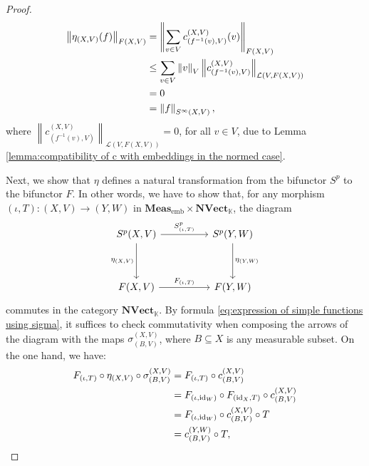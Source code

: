 \documentclass{amsart}
\theoremstyle{definition}
\theoremstyle{plain}
\newcommand{\norm}[1]{\left\lVert #1\right\rVert} %
\newcommand{\id}{\operatorname{id}}
\newcommand{\embMeas}{\mathbf{Meas}_\mathrm{emb}}
\newcommand{\NVect}{\mathbf{NVect}_{\mathbb{K}}}
\begin{document}
\begin{proof}
\begin{align}
                \norm{\eta_{(X,V)}(f)}_{F(X,V)} &= \norm{\sum_{v \in V} c_{\left( f^{-1}(v),V \right)}^{(X,V)}(v)}_{F(X,V)} \notag \\
                &\leq \sum_{v \in V} \norm{v}_V \norm{c_{\left( f^{-1}(v),V \right)}^{(X,V)}}_{\mathcal{L}(V,F(X,V))} \notag \\
                &= 0 \notag \\
                &= \norm{f}_{S^\infty(X,V)}, \notag
            \end{align} 
            where $\norm{c_{\left( f^{-1}(v),V \right)}^{(X,V)}}_{\mathcal{L}(V,F(X,V))} = 0$, for all $v \in V$, due to Lemma \ref{lemma:compatibility of c with embeddings in the normed case}.

            Next, we show that $\eta$ defines a natural transformation from the bifunctor $S^p$ to the bifunctor $F$. 
            In other words, we have to show that, for any morphism $(\iota,T) \colon (X,V) \rightarrow (Y,W)$ in $\embMeas \times \NVect$, the diagram
            \begin{equation*}
                \begin{tikzcd}
                    S^p(X,V) \ar[rr, "S^p_{(\iota,T)}"] \ar[dd, "\eta_{(X,V)}"']  &   & S^p(Y,W) \ar[dd, "\eta_{(Y,W)}"] \\
                        &   & \\
                    F(X,V) \ar[rr, "F_{(\iota,T)}"]   &   & F(Y,W)
                \end{tikzcd}
            \end{equation*}
            commutes in the category $\NVect$.
            By formula \eqref{eq:expression of simple functions using sigma}, it suffices to check commutativity when composing the arrows of the diagram with the maps $\sigma_{(B,V)}^{(X,V)}$, where $B \subseteq X$ is any measurable subset. 
            On the one hand, we have:
            \begin{align}
                F_{(\iota,T)} \circ \eta_{(X,V)} \circ \sigma_{(B,V)}^{(X,V)} &= F_{(\iota,T)} \circ c_{(B,V)}^{(X,V)} \notag \\
                &= F_{(\iota,\id_W)} \circ F_{(\id_X,T)} \circ c_{(B,V)}^{(X,V)} \label{eq:separate the two components of the morphism} \\
                &= F_{(\iota,\id_W)} \circ c_{(B,V)}^{(X,V)} \circ T \label{eq:apply axiom O} \\
                &= c_{(B,V)}^{(Y,W)} \circ T, \notag
            \end{align}

\end{proof}
\end{document}
